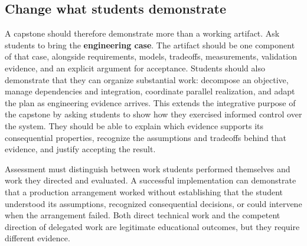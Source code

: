 \subsection{Change what students demonstrate}\label{heading:change-what-students-demonstrate}


A capstone should therefore demonstrate more than a working artifact. Ask students to bring the \textbf{engineering case}. The artifact should be one component of that case, alongside requirements, models, tradeoffs, measurements, validation evidence, and an explicit argument for acceptance. Students should also demonstrate that they can organize substantial work: decompose an objective, manage dependencies and integration, coordinate parallel realization, and adapt the plan as engineering evidence arrives. This extends the integrative purpose of the capstone by asking students to show how they exercised informed control over the system. They should be able to explain which evidence supports its consequential properties, recognize the assumptions and tradeoffs behind that evidence, and justify accepting the result.


Assessment must distinguish between work students performed themselves and work they directed and evaluated. A successful implementation can demonstrate that a production arrangement worked without establishing that the student understood its assumptions, recognized consequential decisions, or could intervene when the arrangement failed. Both direct technical work and the competent direction of delegated work are legitimate educational outcomes, but they require different evidence.


